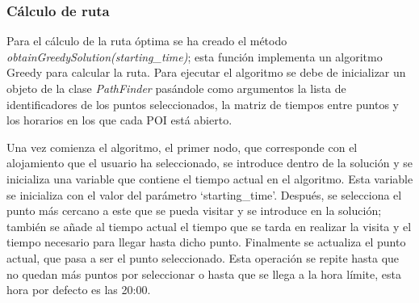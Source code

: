 \subsubsection{Cálculo de ruta}
Para el cálculo de la ruta óptima se ha creado el método \textit{obtainGreedySolution(starting\_time)}; esta función implementa un algoritmo Greedy para calcular la ruta. Para ejecutar el algoritmo se debe de inicializar un objeto de la clase \textit{PathFinder} pasándole como argumentos la lista de identificadores de los puntos seleccionados, la matriz de tiempos entre puntos y los horarios en los que cada POI está abierto.\newline

Una vez comienza el algoritmo, el primer nodo, que corresponde con el alojamiento que el usuario ha seleccionado, se introduce dentro de la solución y se inicializa una variable que contiene el tiempo actual en el algoritmo. Esta variable se inicializa con el valor del parámetro \enquote*{starting\_time}. Después, se selecciona el punto más cercano a este que se pueda visitar y se introduce en la solución; también se añade al tiempo actual el tiempo que se tarda en realizar la visita y el tiempo necesario para llegar hasta dicho punto. Finalmente se actualiza el punto actual, que pasa a ser el punto seleccionado. Esta operación se repite hasta que no quedan más puntos por seleccionar o hasta que se llega a la hora límite, esta hora por defecto es las 20:00.\newline

